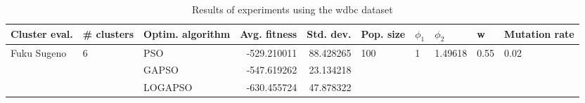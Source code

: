 \begin{table}
\centering
\caption{Results of experiments using the wdbc dataset}
\begin{tabular}{lllrrlllll}
\toprule
               Cluster eval. &        \# clusters & Optim. algorithm &  Avg. fitness &  Std. dev. &            Pop. size &         $\phi_{1}$ &               $\phi_{2}$ &                     w &         Mutation rate \\
\midrule
\multirow{3}{*}{Fuku Sugeno} & \multirow{3}{*}{6} &              PSO &   -529.210011 &  88.428265 & \multirow{3}{*}{100} & \multirow{3}{*}{1} & \multirow{3}{*}{1.49618} & \multirow{3}{*}{0.55} & \multirow{3}{*}{0.02} \\
                             &                    &            GAPSO &   -547.619262 &  23.134218 &                      &                    &                          &                       &                       \\
                             &                    &          LOGAPSO &   -630.455724 &  47.878322 &                      &                    &                          &                       &                       \\
\bottomrule
\end{tabular}
\end{table}
